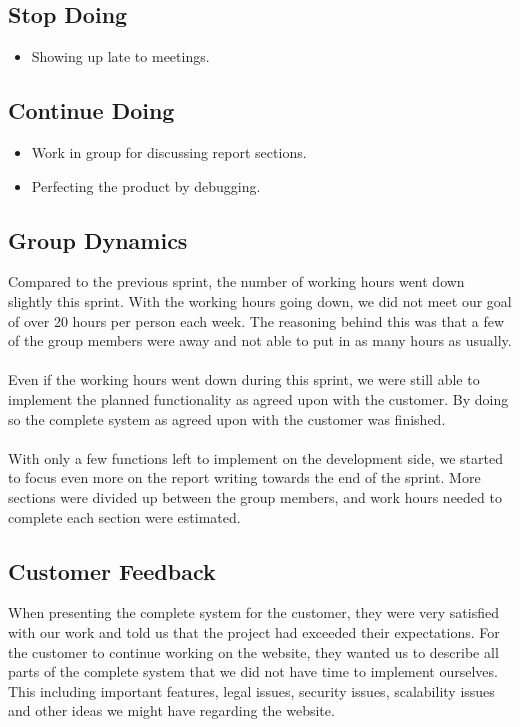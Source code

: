 \subsection{Stop Doing}
\label{subsec:S5RetrospectiveStop}
\begin{itemize}
\item Showing up late to meetings. 
\end{itemize}

\subsection{Continue Doing}
\label{subsec:S5RetrospectiveContinue}

\begin{itemize}
  \item Work in group for discussing report sections.
  \item Perfecting the product by debugging. 
\end{itemize}

\subsection{Group Dynamics}
\label{subsec:S5RetrospectiveDynamics}

Compared to the previous sprint, the number of working hours went down slightly this sprint. With the working hours going down, we did not meet our goal of over 20 hours per person each week. The reasoning behind this was that a few of the group members were away and not able to put in as many hours as usually.

\paragraph{} Even if the working hours went down during this sprint, we were still able to implement the planned functionality as agreed upon with the customer. By doing so the complete system as agreed upon with the customer was finished.

\paragraph{} With only a few functions left to implement on the development side, we started to focus even more on the report writing towards the end of the sprint. More sections were divided up between the group members, and work hours needed to complete each section were estimated.  


\subsection{Customer Feedback}
\label{subsec:S5RetrospectiveFeedback}
When presenting the complete system for the customer, they were very satisfied with our work and told us that the project had exceeded their expectations. For the customer to continue working on the website, they wanted us to describe all parts of the complete system that we did not have time to implement ourselves. This including important features, legal issues, security issues, scalability issues and other ideas we might have regarding the website.

